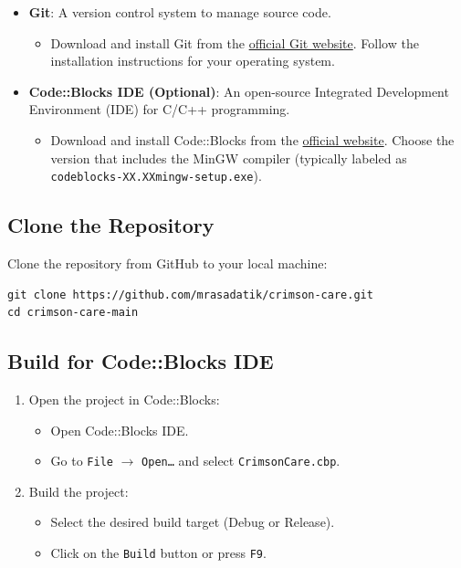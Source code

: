 \documentclass[12pt,a4paper]{report}
\begin{document}
\begin{itemize}
    \item \normalsize \textbf{Git}: A version control system to manage source code.
    \begin{itemize}
        \item Download and install Git from the \href{https://git-scm.com/downloads}{official Git website}. Follow the installation instructions for your operating system.
    \end{itemize}
    \item \normalsize \textbf{Code::Blocks IDE (Optional)}: An open-source Integrated Development Environment (IDE) for C/C++ programming.
    \begin{itemize}
        \item Download and install Code::Blocks from the \href{https://www.codeblocks.org/downloads/binaries/}{official website}. Choose the version that includes the MinGW compiler (typically labeled as \texttt{codeblocks-XX.XXmingw-setup.exe}).
    \end{itemize}
\end{itemize}

\subsection{Clone the Repository}
Clone the repository from GitHub to your local machine:
\begin{verbatim}
git clone https://github.com/mrasadatik/crimson-care.git
cd crimson-care-main
\end{verbatim}

\subsection{Build for Code::Blocks IDE}
\begin{enumerate}
    \item Open the project in Code::Blocks:
    \begin{itemize}
        \item Open Code::Blocks IDE.\
        \item Go to \texttt{File} $\rightarrow$ \texttt{Open\ldots} and select \texttt{CrimsonCare.cbp}.
    \end{itemize}
    \item Build the project:
    \begin{itemize}
        \item Select the desired build target (Debug or Release).
        \item Click on the \texttt{Build} button or press \texttt{F9}.
    \end{itemize}
\end{enumerate}
\end{document}
